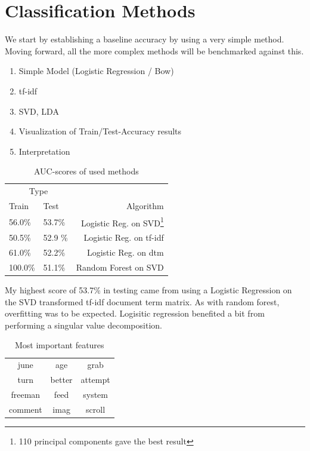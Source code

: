 \documentclass[twoside,twocolumn]{article}
\begin{document}
\section{Classification Methods}
We start by establishing a baseline accuracy by using a very simple method. Moving forward, all the more complex methods will be benchmarked against this.

\begin{enumerate}
\item Simple Model (Logistic Regression / Bow)
\item tf-idf
\item SVD, LDA
\item Visualization of Train/Test-Accuracy results
\item Interpretation
\end{enumerate}


\begin{table}[!htb]
\caption{AUC-scores of used methods}
\centering
\begin{tabular}{llr}
\toprule
\multicolumn{2}{c}{Type} \\
\cmidrule(r){1-2}
Train & Test & Algorithm \\
\midrule
56.0\% & 53.7\% & Logistic Reg. on SVD\footnote{110 principal components gave the best result} \\
50.5\% & 52.9 \% & Logistic Reg. on tf-idf\\
61.0\% & 52.2\% & Logistic Reg. on dtm\\
100.0\% & 51.1\% & Random Forest on SVD \\
\end{tabular}
\end{table}
My highest score of 53.7\% in testing came from using a Logistic Regression on the SVD transformed tf-idf document term matrix.
As with random forest, overfitting was to be expected. Logisitic regression benefited a bit from performing a singular value decomposition. 
\begin{table}[]
\centering
\caption{Most important features}
\label{my-label}
\begin{tabular}{ccc}
\midrule
june & age & grab   \\
turn & better & attempt   \\
freeman & feed & system   \\
comment & imag & scroll   \\
\bottomrule
\end{tabular}
\end{table}
\end{document}

